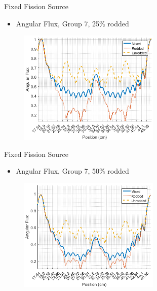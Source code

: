 \begin{frame}[t]{Fixed Fission Source}

\begin{itemize}
  \item Angular Flux, Group 7, 25\% rodded
\end{itemize}
\begin{figure}[H]
    \centering
    \includegraphics[width=0.6\textwidth]{../figs/1dmoc-25mix-angflux7.png}
\end{figure}

\end{frame}


\begin{frame}[t]{Fixed Fission Source}

\begin{itemize}
  \item Angular Flux, Group 7, 50\% rodded
\end{itemize}
\begin{figure}[H]
  \centering
  \includegraphics[width=0.6\textwidth]{../figs/1dmoc-50mix-angflux7.png}
\end{figure}

\end{frame}

